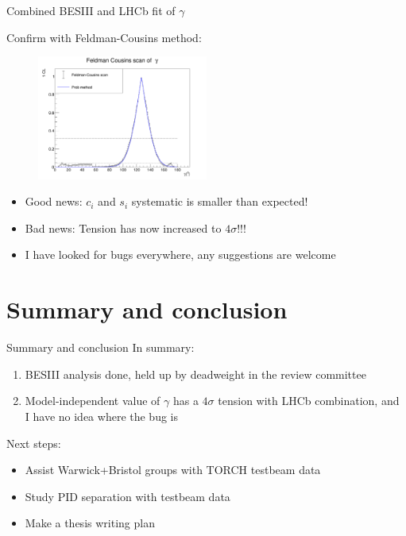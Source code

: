 \documentclass{beamer}
\begin{document}
\begin{frame}{Combined BESIII and LHCb fit of $\gamma$}
  \begin{center}
    {\large Confirm with Feldman-Cousins method:}
  \end{center}
  \begin{figure}
    \includegraphics[width=0.5\textwidth]{Plots/FeldmanCousins_gamma.png}
  \end{figure}
  \begin{itemize}
    \setlength\itemsep{0.5em}
    \item{Good news: $c_i$ and $s_i$ systematic is smaller than expected!}
    \item{Bad news: Tension has now increased to $4\sigma$!!!}
    \item{I have looked for bugs everywhere, any suggestions are welcome}
  \end{itemize}
\end{frame}

\section{Summary and conclusion}

\begin{frame}{Summary and conclusion}
  \vspace{0.0cm}
  {\Large In summary:}
  \begin{enumerate}
    \setlength\itemsep{0.7em}
    \item{BESIII analysis done, held up by deadweight in the review committee}
    \item{Model-independent value of $\gamma$ has a $4\sigma$ tension with LHCb combination, and I have no idea where the bug is}
  \end{enumerate}
  \vspace{0.4cm}
  {\Large Next steps:}
  \begin{itemize}
    \setlength\itemsep{0.7em}
    \item{Assist Warwick+Bristol groups with TORCH testbeam data}
    \item{Study PID separation with testbeam data}
    \item{Make a thesis writing plan}
  \end{itemize}
\end{frame}
\end{document}
